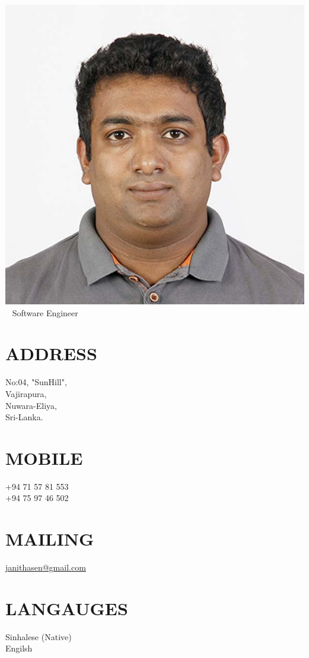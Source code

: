 \documentclass[]{cv-class}
\begin{document}
\begin{aside}
\color{blue}
  \includegraphics[scale=0.9]{img/photo.jpg}
    ~
      {Software Engineer}
   ~
  \section{ADDRESS}
    {\whitebodyfont No:04, "SunHill",\\
    Vajirapura,\\
    Nuwara-Eliya,\\
    Sri-Lanka.}
    ~
  \section{MOBILE}
    {\whitebodyfont +94 71 57 81 553\\
    +94 75 97 46 502}
    ~
  \section{MAILING}
    \underline{\href{mailto:janithasen@gmail.com}{{\whitebodyfont janithasen@gmail.com}}}
    ~
  \section{LANGAUGES}
  	{\whitebodyfont Sinhalese (Native)\\
    Engilsh}
    ~ 

\end{aside}
\end{document}
